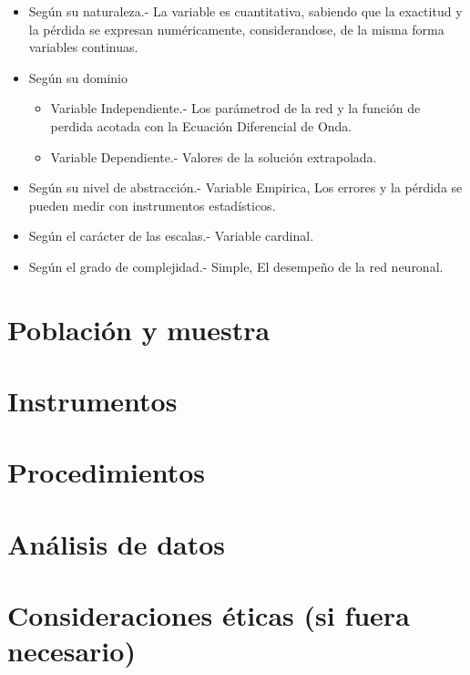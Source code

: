 \begin{itemize}
    \item Según su naturaleza.-
    La variable es cuantitativa, sabiendo que la exactitud y la pérdida se expresan numéricamente, considerandose, de la misma forma variables continuas.

    \item Según su dominio
    \begin{itemize}
        \item Variable Independiente.- Los parámetrod de la red y la función de perdida acotada con la Ecuación Diferencial de Onda.
        \item Variable Dependiente.- Valores de la solución extrapolada.
    \end{itemize}

    \item Según su nivel de abstracción.- 
    Variable Empirica, Los errores y la pérdida se pueden medir con instrumentos estadísticos.

    \item Según el carácter de las escalas.-
    Variable cardinal.

    \item Según el grado de complejidad.-
    Simple, El desempeño de la red neuronal.
\end{itemize}

\section{Población y muestra}
\section{Instrumentos}
\section{Procedimientos}
\section{Análisis de datos}
\section{Consideraciones éticas (si fuera necesario)}


